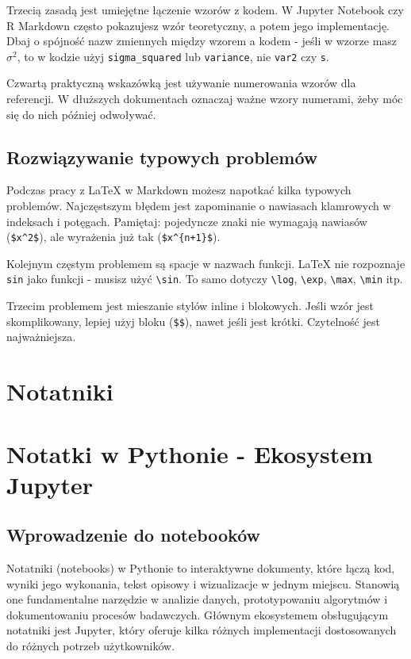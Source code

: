 \documentclass[
  polish,
  letterpaper,
  DIV=11,
  numbers=noendperiod]{scrreprt}
\begin{document}
Trzecią zasadą jest umiejętne łączenie wzorów z kodem. W Jupyter
Notebook czy R Markdown często pokazujesz wzór teoretyczny, a potem jego
implementację. Dbaj o spójność nazw zmiennych między wzorem a kodem -
jeśli w wzorze masz \(\sigma^2\), to w kodzie użyj
\texttt{sigma\_squared} lub \texttt{variance}, nie \texttt{var2} czy
\texttt{s}.

Czwartą praktyczną wskazówką jest używanie numerowania wzorów dla
referencji. W dłuższych dokumentach oznaczaj ważne wzory numerami, żeby
móc się do nich później odwoływać.

\section{Rozwiązywanie typowych
problemów}\label{rozwiux105zywanie-typowych-problemuxf3w}

Podczas pracy z LaTeX w Markdown możesz napotkać kilka typowych
problemów. Najczęstszym błędem jest zapominanie o nawiasach klamrowych w
indeksach i potęgach. Pamiętaj: pojedyncze znaki nie wymagają nawiasów
(\texttt{\$x\^{}2\$}), ale wyrażenia już tak
(\texttt{\$x\^{}\{n+1\}\$}).

Kolejnym częstym problemem są spacje w nazwach funkcji. LaTeX nie
rozpoznaje \texttt{sin} jako funkcji - musisz użyć
\texttt{\textbackslash{}sin}. To samo dotyczy
\texttt{\textbackslash{}log}, \texttt{\textbackslash{}exp},
\texttt{\textbackslash{}max}, \texttt{\textbackslash{}min} itp.

Trzecim problemem jest mieszanie stylów inline i blokowych. Jeśli wzór
jest skomplikowany, lepiej użyj bloku (\texttt{\$\$}), nawet jeśli jest
krótki. Czytelność jest najważniejsza.

\chapter{Notatniki}\label{notatniki}

\chapter{Notatki w Pythonie - Ekosystem
Jupyter}\label{notatki-w-pythonie---ekosystem-jupyter}

\section{Wprowadzenie do
notebooków}\label{wprowadzenie-do-notebookuxf3w}

Notatniki (notebooks) w Pythonie to interaktywne dokumenty, które łączą
kod, wyniki jego wykonania, tekst opisowy i wizualizacje w jednym
miejscu. Stanowią one fundamentalne narzędzie w analizie danych,
prototypowaniu algorytmów i dokumentowaniu procesów badawczych. Głównym
ekosystemem obsługującym notatniki jest Jupyter, który oferuje kilka
różnych implementacji dostosowanych do różnych potrzeb użytkowników.
\end{document}
